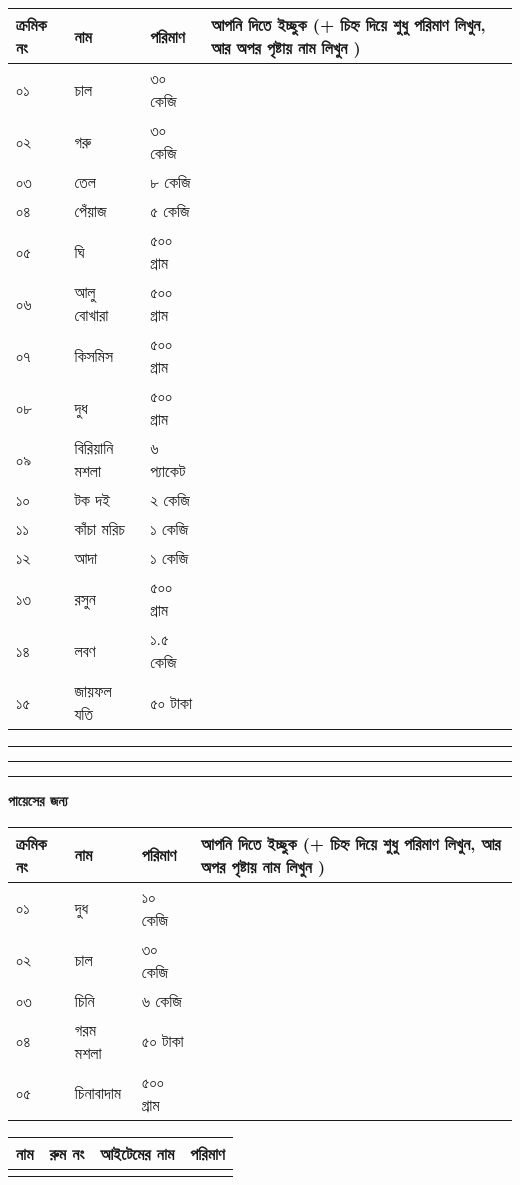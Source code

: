 \documentclass[12pt]{article}
\newcommand{\aline}{\\\hline \arabic{theyflines} &&&\rule{0cm}{1cm}}
\begin{document}
\begin{center}
\end{center}
\noindent
\bgroup
\def\arraystretch{2.4}
\begin{tabular}{@{}lll|p{15cm}}
\toprule
ক্রমিক নং &  নাম &  পরিমাণ & আপনি দিতে ইচ্ছুক (+ চিহ্ন দিয়ে শুধু পরিমাণ লিখুন, আর অপর পৃষ্টায় নাম লিখুন )\\
\toprule
০১ & চাল & ৩০ কেজি &\\
\hline
০২ & গরু & ৩০ কেজি &\\
\hline
০৩ & তেল & ৮ কেজি &\\
\hline
০৪ & পেঁয়াজ & ৫ কেজি &\\
\hline
০৫ & ঘি & ৫০০ গ্রাম &\\
\hline
০৬ & আলু বোখারা & ৫০০ গ্রাম &\\
\hline
০৭ & কিসমিস & ৫০০ গ্রাম &\\
\hline
০৮ & দুধ & ৫০০ গ্রাম &\\
\hline
০৯ & বিরিয়ানি মশলা & ৬ প্যাকেট &\\
\hline
১০ & টক দই & ২ কেজি &\\
\hline
১১ & কাঁচা মরিচ & ১ কেজি &\\
\hline
১২ & আদা & ১ কেজি &\\
\hline
১৩ & রসুন & ৫০০ গ্রাম &\\
\hline
১৪ & লবণ & ১.৫ কেজি &\\
\hline
১৫ & জায়ফল যতি & ৫০ টাকা &\\
\bottomrule
\end{tabular}
\hrule
\hrule
\hrule
\vspace{0.5cm}
\textbf{পায়েসের জন্য}\\
\noindent
\begin{tabular}{@{}lll|p{15cm}}
\toprule
ক্রমিক নং &  নাম &  পরিমাণ & আপনি দিতে ইচ্ছুক (+ চিহ্ন দিয়ে শুধু পরিমাণ লিখুন, আর অপর পৃষ্টায় নাম লিখুন )\\
\toprule
০১ & দুধ & ১০ কেজি & \\
\hline
০২ & চাল & ৩০ কেজি & \\
\hline
০৩ & চিনি & ৬ কেজি & \\
\hline
০৪ & গরম মশলা & ৫০ টাকা & \\
\hline
০৫ & চিনাবাদাম & ৫০০ গ্রাম & \\
\bottomrule
\end{tabular}
\egroup
\newpage
\noindent
\begin{tabular}{|p{6cm}|p{3cm}|p{5cm}|p{4cm}|}
\toprule
নাম & রুম নং & আইটেমের নাম & পরিমাণ
\forloop{theyflines}{1}{\value{theyflines} < 26}{\aline}\\
\toprule
\end{tabular}
\end{document}
